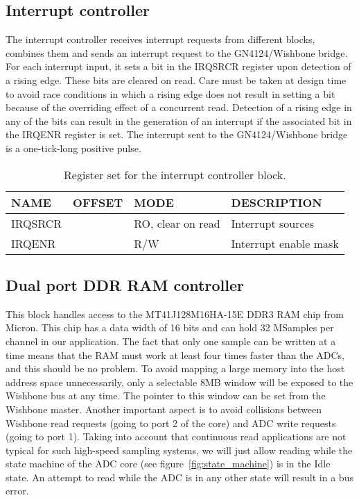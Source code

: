 \documentclass{article}
\begin{document}
\subsection{Interrupt controller}
The interrupt controller receives interrupt requests from different blocks, combines them and sends an interrupt request to the GN4124/Wishbone bridge. For each interrupt input, it sets a bit in the IRQSRCR register upon detection of a rising edge. These bits are cleared on read. Care must be taken at design time to avoid race conditions in which a rising edge does not result in setting a bit because of the overriding effect of a concurrent read. Detection of a rising edge in any of the bits can result in the generation of an interrupt if the associated bit in the IRQENR register is set. The interrupt sent to the GN4124/Wishbone bridge is a one-tick-long positive pulse.

\begin{table}[htbp]
  \centering
  \begin{tabularx}{\textwidth}{|l|r|l|X|}
    \hline
    \textbf{NAME} & \textbf{OFFSET} & \textbf{MODE} & \textbf{DESCRIPTION} \\
    \hline
    \hline
    IRQSRCR & & RO, clear on read & Interrupt sources\\
    \hline
    IRQENR & & R/W & Interrupt enable mask\\
    \hline
  \end{tabularx}
  \caption{Register set for the interrupt controller block.}
  \label{tab:irq_control}
\end{table}

\subsection{Dual port DDR RAM controller}
This block handles access to the MT41J128M16HA-15E DDR3 RAM chip from Micron. This chip has a data width of 16 bits and can hold 32 MSamples per channel in our application. The fact that only one sample can be written at a time means that the RAM must work at least four times faster than the ADCs, and this should be no problem. To avoid mapping a large memory into the host address space unnecessarily, only a selectable 8MB window will be exposed to the Wishbone bus at any time. The pointer to this window can be set from the Wishbone master. Another important aspect is to avoid collisions between Wishbone read requests (going to port 2 of the core) and ADC write requests (going to port 1). Taking into account that continuous read applications are not typical for such high-speed sampling systems, we will just allow reading while the state machine of the ADC core (see figure~\ref{fig:state_machine}) is in the Idle state. An attempt to read while the ADC is in any other state will result in a bus error.
\end{document}
